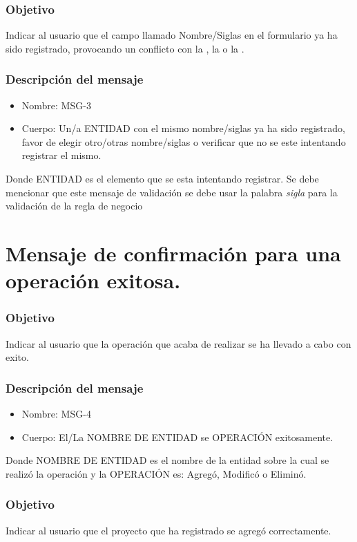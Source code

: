 \subsubsection{Objetivo}
Indicar al usuario que el campo llamado Nombre/Siglas en el formulario ya ha sido registrado, provocando un conflicto con la , la  o la .

\subsubsection{Descripción del mensaje}
\begin{itemize}
\item Nombre: MSG-3
\item Cuerpo: Un/a ENTIDAD con el mismo nombre/siglas ya ha sido registrado, favor de elegir otro/otras nombre/siglas o verificar que no se este intentando registrar el mismo.

\end{itemize}
Donde ENTIDAD es el elemento que se esta intentando registrar. Se debe mencionar que este mensaje de validación se debe usar la palabra \textit{sigla} para la validación de la regla de negocio  


\section{Mensaje de confirmación para una operación exitosa.}\label{MSG4}

\subsubsection{Objetivo}
Indicar al usuario que la operación que acaba de realizar se ha llevado a cabo con exito.

\subsubsection{Descripción del mensaje}
\begin{itemize}
\item Nombre: MSG-4
\item Cuerpo: El/La NOMBRE DE ENTIDAD se OPERACIÓN exitosamente. 
\end{itemize}
Donde NOMBRE DE ENTIDAD es el nombre de la entidad sobre la cual se realizó la operación y la OPERACIÓN es: Agregó, Modificó o Eliminó.

\subsubsection{Objetivo}
Indicar al usuario que el proyecto que ha registrado se agregó correctamente.

